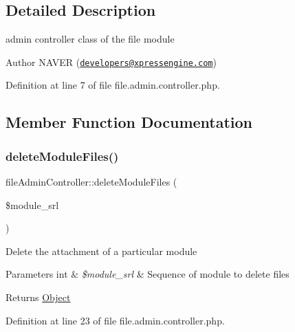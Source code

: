 \subsection{Detailed Description}
admin controller class of the file module \begin{DoxyAuthor}{Author}
N\+A\+V\+ER (\href{mailto:developers@xpressengine.com}{\tt developers@xpressengine.\+com}) 
\end{DoxyAuthor}


Definition at line 7 of file file.\+admin.\+controller.\+php.



\subsection{Member Function Documentation}
\hypertarget{classfileAdminController_aaa637d3e043a4be10292fa2514c4f0f3}{}\label{classfileAdminController_aaa637d3e043a4be10292fa2514c4f0f3} 
\subsubsection{\texorpdfstring{delete\+Module\+Files()}{deleteModuleFiles()}}
{\footnotesize\ttfamily file\+Admin\+Controller\+::delete\+Module\+Files (\begin{DoxyParamCaption}\item[{}]{\$module\+\_\+srl }\end{DoxyParamCaption})}

Delete the attachment of a particular module


\begin{DoxyParams}[1]{Parameters}
int & {\em \$module\+\_\+srl} & Sequence of module to delete files \\
\hline
\end{DoxyParams}
\begin{DoxyReturn}{Returns}
\hyperlink{classObject}{Object} 
\end{DoxyReturn}


Definition at line 23 of file file.\+admin.\+controller.\+php.

\hypertarget{classfileAdminController_a7926db5aa01c3f22d73c746dfc10c318}{}\label{classfileAdminController_a7926db5aa01c3f22d73c746dfc10c318} 
